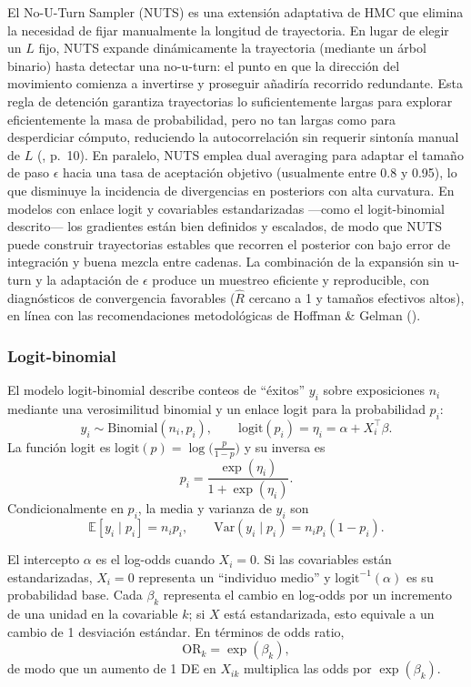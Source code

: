 \documentclass[
]{article}
\begin{document}
El No-U-Turn Sampler (NUTS) es una extensión adaptativa de HMC que
elimina la necesidad de fijar manualmente la longitud de trayectoria. En
lugar de elegir un \(L\) fijo, NUTS expande dinámicamente la trayectoria
(mediante un árbol binario) hasta detectar una no-u-turn: el punto en
que la dirección del movimiento comienza a invertirse y proseguir
añadiría recorrido redundante. Esta regla de detención garantiza
trayectorias lo suficientemente largas para explorar eficientemente la
masa de probabilidad, pero no tan largas como para desperdiciar cómputo,
reduciendo la autocorrelación sin requerir sintonía manual de \(L\)
(,
p.~10). En paralelo, NUTS emplea dual averaging para adaptar el tamaño
de paso \(\epsilon\) hacia una tasa de aceptación objetivo (usualmente
entre 0.8 y 0.95), lo que disminuye la incidencia de divergencias en
posteriors con alta curvatura. En modelos con enlace logit y covariables
estandarizadas ---como el logit-binomial descrito--- los gradientes
están bien definidos y escalados, de modo que NUTS puede construir
trayectorias estables que recorren el posterior con bajo error de
integración y buena mezcla entre cadenas. La combinación de la expansión
sin u-turn y la adaptación de \(\epsilon\) produce un muestreo eficiente
y reproducible, con diagnósticos de convergencia favorables (\(\hat{R}\)
cercano a 1 y tamaños efectivos altos), en línea con las recomendaciones
metodológicas de Hoffman \& Gelman
().

\subsubsection{Logit-binomial}\label{logit-binomial}

El modelo logit-binomial describe conteos de ``éxitos'' \(y_i\) sobre
exposiciones \(n_i\) mediante una verosimilitud binomial y un enlace
logit para la probabilidad \(p_i\): \[
y_i \sim \mathrm{Binomial}(n_i, p_i),\qquad
\mathrm{logit}(p_i)=\eta_i=\alpha + X_i^\top\beta.
\] La función logit es
\(\mathrm{logit}(p)=\log\!\big(\tfrac{p}{1-p}\big)\) y su inversa es \[
p_i=\frac{\exp(\eta_i)}{1+\exp(\eta_i)}.
\] Condicionalmente en \(p_i\), la media y varianza de \(y_i\) son \[
\mathbb E[y_i\mid p_i]=n_i p_i,\qquad \mathrm{Var}(y_i\mid p_i)=n_i p_i(1-p_i).
\]

El intercepto \(\alpha\) es el log-odds cuando \(X_i=0\). Si las
covariables están estandarizadas, \(X_i=0\) representa un ``individuo
medio'' y \(\mathrm{logit}^{-1}(\alpha)\) es su probabilidad base. Cada
\(\beta_k\) representa el cambio en log-odds por un incremento de una
unidad en la covariable \(k\); si \(X\) está estandarizada, esto
equivale a un cambio de 1 desviación estándar. En términos de odds
ratio, \[
\text{OR}_k=\exp(\beta_k),
\] de modo que un aumento de 1 DE en \(X_{ik}\) multiplica las odds por
\(\exp(\beta_k)\).
\end{document}
